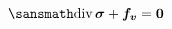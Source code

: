 \documentclass[preview]{standalone}
\begin{document}
$ \displaystyle \sansmath
  \boldsymbol{\text{div}}\,\boldsymbol{\sigma} + \boldsymbol{f_{v}} = \boldsymbol{0}
$
\end{document}
